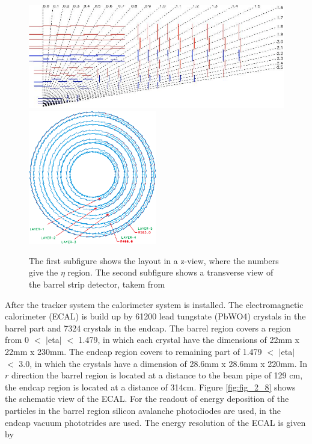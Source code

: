 \begin{figure}[ht]
	\centering
	\includegraphics[width=1\textwidth]{pictures/CMS_strip.pdf}
	\includegraphics[width=0.5\textwidth]{pictures/CMS_strip2.pdf}

	\caption[Strip detector of CMS]{The first subfigure shows the layout in a z-view, where the numbers give the $\eta$ region. The second subfigure shows a transverse view of the barrel strip detector, takem from \cite{CMS2, ECAL}}
	\label{fig:fig_2_7}
\end{figure}

After the tracker system the calorimeter system is installed. The electromagnetic calorimeter (\gls{ECAL}) \cite{CMS2, ECAL} is build up by 61200 lead tungstate (\gls{PbWO4}) crystals in the barrel part and 7324 crystals in the endcap. The barrel region covers a region from 0 $<$ $|$\gls{eta}$|$ $<$ 1.479, in which each crystal have the dimensions of 22mm x 22mm x 230mm. The endcap region covers to remaining part of 1.479 $<$ $|$\gls{eta}$|$ $<$ 3.0, in which the crystals have a dimension of 28.6mm x 28.6mm x 220mm. In $r$ direction the barrel region is located at a distance to the beam pipe of 129 cm, the endcap region is located at a distance of 314cm. Figure \ref{fig:fig_2_8} shows the schematic view of the \gls{ECAL}. For the readout of energy deposition of the particles in the barrel region silicon avalanche photodiodes are used, in the endcap vacuum phototrides are used. The energy resolution of the \gls{ECAL} is given by

